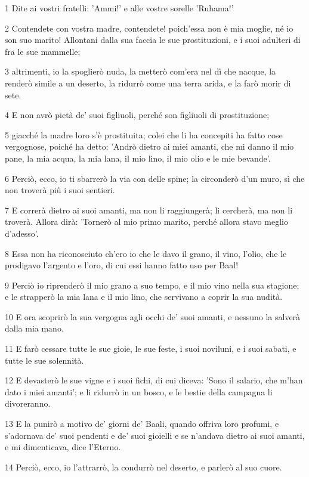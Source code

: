 \par 1 Dite ai vostri fratelli: 'Ammi!' e alle vostre sorelle 'Ruhama!'
\par 2 Contendete con vostra madre, contendete! poich'essa non è mia moglie, né io son suo marito! Allontani dalla sua faccia le sue prostituzioni, e i suoi adulteri di fra le sue mammelle;
\par 3 altrimenti, io la spoglierò nuda, la metterò com'era nel dì che nacque, la renderò simile a un deserto, la ridurrò come una terra arida, e la farò morir di sete.
\par 4 E non avrò pietà de' suoi figliuoli, perché son figliuoli di prostituzione;
\par 5 giacché la madre loro s'è prostituita; colei che li ha concepiti ha fatto cose vergognose, poiché ha detto: 'Andrò dietro ai miei amanti, che mi danno il mio pane, la mia acqua, la mia lana, il mio lino, il mio olio e le mie bevande'.
\par 6 Perciò, ecco, io ti sbarrerò la via con delle spine; la circonderò d'un muro, sì che non troverà più i suoi sentieri.
\par 7 E correrà dietro ai suoi amanti, ma non li raggiungerà; li cercherà, ma non li troverà. Allora dirà: 'Tornerò al mio primo marito, perché allora stavo meglio d'adesso'.
\par 8 Essa non ha riconosciuto ch'ero io che le davo il grano, il vino, l'olio, che le prodigavo l'argento e l'oro, di cui essi hanno fatto uso per Baal!
\par 9 Perciò io riprenderò il mio grano a suo tempo, e il mio vino nella sua stagione; e le strapperò la mia lana e il mio lino, che servivano a coprir la sua nudità.
\par 10 E ora scoprirò la sua vergogna agli occhi de' suoi amanti, e nessuno la salverà dalla mia mano.
\par 11 E farò cessare tutte le sue gioie, le sue feste, i suoi noviluni, e i suoi sabati, e tutte le sue solennità.
\par 12 E devasterò le sue vigne e i suoi fichi, di cui diceva: 'Sono il salario, che m'han dato i miei amanti'; e li ridurrò in un bosco, e le bestie della campagna li divoreranno.
\par 13 E la punirò a motivo de' giorni de' Baali, quando offriva loro profumi, e s'adornava de' suoi pendenti e de' suoi gioielli e se n'andava dietro ai suoi amanti, e mi dimenticava, dice l'Eterno.
\par 14 Perciò, ecco, io l'attrarrò, la condurrò nel deserto, e parlerò al suo cuore.
